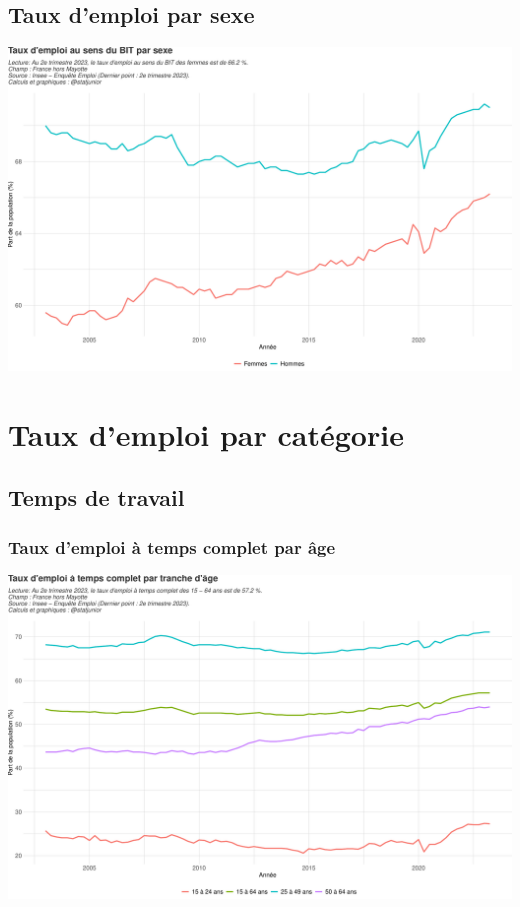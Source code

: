 \documentclass[
  paper=a4,
  ,captions=tableheading
]{scrartcl}
\begin{document}
\hypertarget{taux-demploi-par-sexe}{%
\subsection{Taux d'emploi par sexe}\label{taux-demploi-par-sexe}}

\includegraphics{rapport_activite_emploi_chomage_insee_files/figure-latex/unnamed-chunk-5-1.pdf}

\newpage

\hypertarget{taux-demploi-par-catuxe9gorie}{%
\section{Taux d'emploi par
catégorie}\label{taux-demploi-par-catuxe9gorie}}

\hypertarget{temps-de-travail}{%
\subsection{Temps de travail}\label{temps-de-travail}}

\hypertarget{taux-demploi-uxe0-temps-complet-par-uxe2ge}{%
\subsubsection{Taux d'emploi à temps complet par
âge}\label{taux-demploi-uxe0-temps-complet-par-uxe2ge}}

\includegraphics{rapport_activite_emploi_chomage_insee_files/figure-latex/unnamed-chunk-6-1.pdf}
\end{document}
